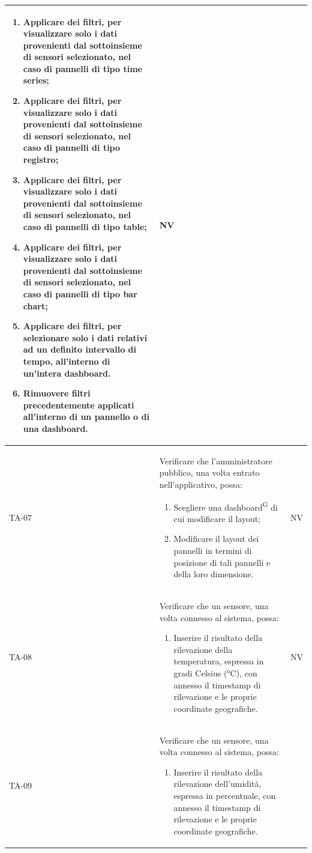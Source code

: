 \documentclass[8pt]{article}
\newcommand{\glossterm}[1]{#1\textsuperscript{G}} %
\begin{document}
\begin{longtable}{|>{\centering}p{2cm}|>{\RaggedRight}m{12cm}|>{\centering\arraybackslash}p{2cm}|}
\begin{enumerate}
        \item Applicare dei filtri, per visualizzare solo i dati provenienti dal sottoinsieme di sensori selezionato, nel caso di pannelli di tipo time series; 
        \item Applicare dei filtri, per visualizzare solo i dati provenienti dal sottoinsieme di sensori selezionato, nel caso di pannelli di tipo registro;
        \item Applicare dei filtri, per visualizzare solo i dati provenienti dal sottoinsieme di sensori selezionato, nel caso di pannelli di tipo table;
        \item Applicare dei filtri, per visualizzare solo i dati provenienti dal sottoinsieme di sensori selezionato, nel caso di pannelli di tipo bar chart;  
        \item Applicare dei filtri, per selezionare solo i dati relativi ad un definito intervallo di tempo, all’interno di un’intera dashboard.
        \item Rimuovere filtri precedentemente applicati all'interno di un pannello o di una dashboard.
    \end{enumerate}
    & NV \\
    \hline
    TA-07 & Verificare che l'amministratore pubblico, una volta entrato
    nell’applicativo, possa:
    \begin{enumerate}
        \item Scegliere una \glossterm{dashboard} di cui modificare il layout;
        \item Modificare il layout dei pannelli in termini di posizione di tali pannelli e della loro dimensione.
    \end{enumerate}
    & NV \\
    \hline
    TA-08 &
    Verificare che un sensore, una volta connesso al sistema, possa:
    \begin{enumerate}
        \item Inserire il risultato della rilevazione della temperatura, espressa in gradi Celsius
            (°C), con annesso il timestamp di rilevazione e le proprie coordinate geografiche.        
    \end{enumerate}
    & NV \\
    \hline
    TA-09 &
    Verificare che un sensore, una volta connesso al sistema, possa:
    \begin{enumerate}
    \item Inserire il risultato della rilevazione dell’umidità, espressa in percentuale, con annesso il timestamp di rilevazione e le proprie coordinate geografiche.

\end{enumerate}
\end{longtable}
\end{document}
